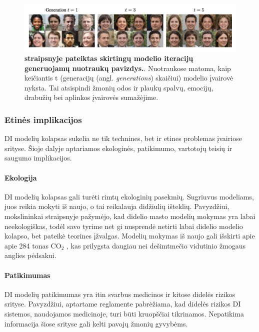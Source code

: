 \documentclass{VUMIFInfKursinis}
\begin{document}
\begin{figure}[H]
    \centering
    \includegraphics[scale=0.5]{img/nuotraukuKolapsas.png}
    \caption{\textbf{\cite{ModelsGoMAD} straipsnyje pateiktas skirtingų modelio iteracijų generuojamų nuotraukų pavizdys.}. Nuotraukose matoma, kaip keičiantis t (generacijų (angl. \textsl{generations}) skaičiui) modelio įvairovė nyksta. Tai atsispindi žmonių odos ir plaukų spalvų, emocijų, drabužių bei aplinkos įvairovės sumažėjime.}  
    \label{img:nuotraukuKolapsas}
\end{figure}

\subsubsection{Etinės implikacijos}

DI modelių kolapsas sukelia ne tik technines, bet ir etines problemas įvairiose srityse. Šioje dalyje aptariamos ekologinės, patikimumo, vartotojų teisių ir saugumo implikacijos.

\paragraph{Ekologija} 
DI modelių kolapsas gali turėti rimtų ekologinių pasekmių. Sugriuvus modeliams, juos reikia mokyti iš naujo, o tai reikalauja didžiulių išteklių. Pavyzdžiui, mokslininkai straipsnyje \cite{AICollapseNature} pažymėjo, kad didelio masto modelių mokymas yra labai neekologiškas, todėl savo tyrime net gi nusprendė netirti labai didelio modelio kolapso, bet pateikė teorines įžvalgas. Modelių mokymas iš naujo gali išskirti apie apie 284 tonas CO$_2$ \cite{energy_2019}, kas prilygsta daugiau nei dešimtmečio vidutinio žmogaus anglies pėdsakui.


\paragraph{Patikimumas} 
DI modelių patikimumas yra itin svarbus medicinos ir kitose didelės rizikos srityse. Pavyzdžiui, aptartame reglamente \cite{AIEuropeanAct} pabrėžiama, kad didelės rizikos DI sistemos, naudojamos medicinoje, turi būti kruopščiai tikrinamos. Nepatikima informacija šiose srityse gali kelti pavojų žmonių gyvybėms. 
\end{document}
